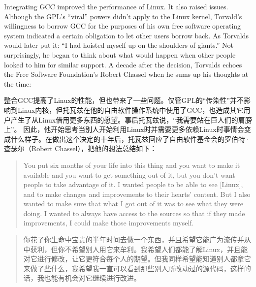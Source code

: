 \ifdefined\eng
Integrating GCC improved the performance of Linux. It also raised issues. Although the GPL's ``viral'' powers didn't apply to the Linux kernel, Torvald's willingness to borrow GCC for the purposes of his own free software operating system indicated a certain obligation to let other users borrow back. As Torvalds would later put it: ``I had hoisted myself up on the shoulders of giants.'' Not surprisingly, he began to think about what would happen when other people looked to him for similar support. A decade after the decision, Torvalds echoes the Free Software Foundation's Robert Chassel when he sums up his thoughts at the time:
\fi

\ifdefined\chs
整合GCC提高了Linux的性能，但也带来了一些问题。仅管GPL的``传染性''并不影响到Linux内核，但托瓦兹在他的自由软件操作系统中使用了GCC，也造成其它用户产生了从Linux借用更多东西的愿望。事后托瓦兹说，``我需要站在巨人们的肩膀上''。 因此，他开始思考当别人开始利用Linux时并需要更多依赖Linux时事情会变成什么样子。在做出这个决定的十年后，托瓦兹回应了自由软件基金会的罗伯特·查瑟尔（Robert Chassel），把他的想法总结如下：
\fi

\ifdefined\eng
\begin{quote}
You put six months of your life into this thing and you want to make it available and you want to get something out of it, but you don't want people to take advantage of it. I wanted people to be able to see [Linux], and to make changes and improvements to their hearts' content. But I also wanted to make sure that what I got out of it was to see what they were doing. I wanted to always have access to the sources so that if they made improvements, I could make those improvements myself.
\end{quote}
\fi

\ifdefined\chs
\begin{quote}
你花了你生命中宝贵的半年时间去做一个东西，并且希望它能广为流传并从中获利，但你不希望别人用它来牟利。我希望人们都能了解Linux，并且能对它进行修改，让它更符合每个人的期望。但我同样希望能知道别人都拿它来做了些什么，我希望我一直可以看到那些别人所改动过的源代码，这样的话，我也能有机会对它继续进行改进。
\end{quote}
\fi

